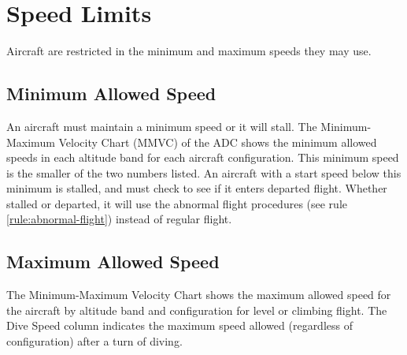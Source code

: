 
\section{Speed Limits}
\label{rule:speed-limits}

Aircraft are restricted in the minimum and maximum speeds they may use.

\subsection{Minimum Allowed Speed}
An aircraft must maintain a minimum speed or it will stall. The Minimum-Maximum Velocity Chart (MMVC) of the ADC shows the minimum allowed speeds in each altitude band for each aircraft configuration. This minimum speed is the smaller of the two numbers listed. An aircraft with a start speed below this minimum is stalled, and must check to see if it enters departed flight. Whether stalled or departed, it will use the abnormal flight procedures (see rule \ref{rule:abnormal-flight}) instead of regular flight.

\subsection{Maximum Allowed Speed} The Minimum-Maximum Velocity Chart shows the maximum allowed speed for the aircraft by altitude band and configuration for level or climbing flight. The Dive Speed column indicates the maximum speed allowed (regardless of configuration) after a turn of diving.

